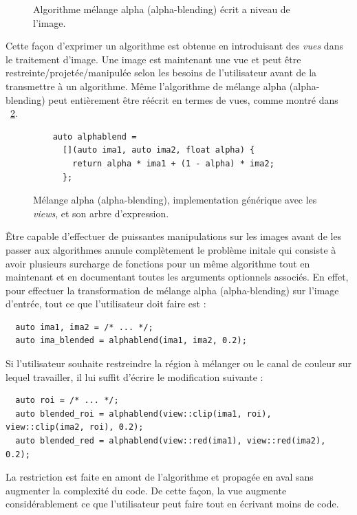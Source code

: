 \begin{figure}[htbp]
  \centering
  

  \caption[]{Algorithme mélange alpha (alpha-blending) écrit a niveau de l'image.}
  \label{resume:fig:view.alphablend}
\end{figure}

Cette façon d'exprimer un algorithme est obtenue en introduisant des \emph{vues} dans le traitement d'image. Une image
est maintenant une vue et peut être restreinte/projetée/manipulée selon les besoins de l'utilisateur avant de la
transmettre à un algorithme. Même l'algorithme de mélange alpha (alpha-blending) peut entièrement être réécrit en termes
de vues, comme montré dans ~\cref{resume:fig:new.alphablend}.

\begin{figure}[htbp]
  \centering
  \begin{minipage}[b]{5.5cm}
    
  \end{minipage}
  \begin{minipage}[b]{5.5cm}
    \begin{verbatim}
    auto alphablend =
      [](auto ima1, auto ima2, float alpha) {
        return alpha * ima1 + (1 - alpha) * ima2;
      };
    \end{verbatim}
    \bigskip
    \bigskip
    \bigskip
  \end{minipage}
  \caption[]{Mélange alpha (alpha-blending), implementation générique avec les \emph{views}, et son arbre d'expression.}
  \label{resume:fig:new.alphablend}
\end{figure}

Être capable d'effectuer de puissantes manipulations sur les images avant de les passer aux algorithmes annule
complètement le problème initale qui consiste à avoir plusieurs surcharge de fonctions pour un même algorithme tout en
maintenant et en documentant toutes les arguments optionnels associés. En effet, pour effectuer la transformation de
mélange alpha (alpha-blending) sur l'image d'entrée, tout ce que l'utilisateur doit faire est :
\begin{verbatim}
  auto ima1, ima2 = /* ... */;
  auto ima_blended = alphablend(ima1, ima2, 0.2);
\end{verbatim}
Si l'utilisateur souhaite restreindre la région à mélanger ou le canal de couleur sur lequel travailler, il lui suffit
d'écrire le modification suivante :
\begin{verbatim}
  auto roi = /* ... */;
  auto blended_roi = alphablend(view::clip(ima1, roi), view::clip(ima2, roi), 0.2);
  auto blended_red = alphablend(view::red(ima1), view::red(ima2), 0.2);
\end{verbatim}
La restriction est faite en amont de l'algorithme et propagée en aval sans augmenter la complexité du code. De cette
façon, la vue augmente considérablement ce que l'utilisateur peut faire tout en écrivant moins de code.

